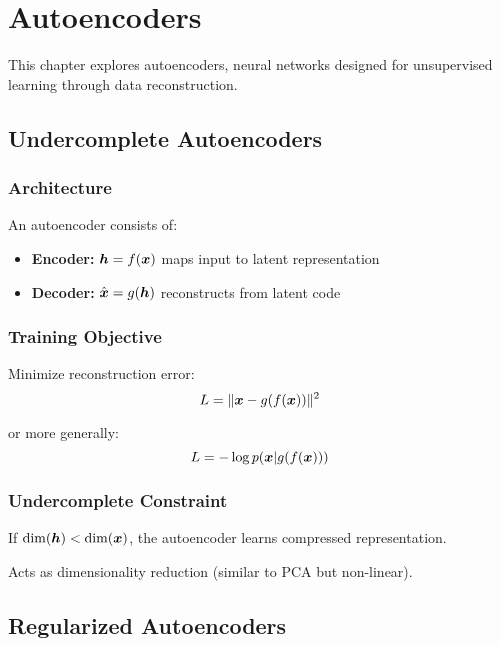 
\chapter{Autoencoders}
\label{chap:autoencoders}

This chapter explores autoencoders, neural networks designed for unsupervised learning through data reconstruction.

\section{Undercomplete Autoencoders}
\label{sec:undercomplete-ae}

\subsection{Architecture}

An autoencoder consists of:
\begin{itemize}
    \item \textbf{Encoder:} $\boldsymbol{h} = f(\boldsymbol{x})$ maps input to latent representation
    \item \textbf{Decoder:} $\hat{\boldsymbol{x}} = g(\boldsymbol{h})$ reconstructs from latent code
\end{itemize}

\subsection{Training Objective}

Minimize reconstruction error:
\begin{equation}
L = \|\boldsymbol{x} - g(f(\boldsymbol{x}))\|^2
\end{equation}

or more generally:
\begin{equation}
L = -\log p(\boldsymbol{x} | g(f(\boldsymbol{x})))
\end{equation}

\subsection{Undercomplete Constraint}

If $\dim(\boldsymbol{h}) < \dim(\boldsymbol{x})$, the autoencoder learns compressed representation.

Acts as dimensionality reduction (similar to PCA but non-linear).

\section{Regularized Autoencoders}
\label{sec:regularized-ae}

